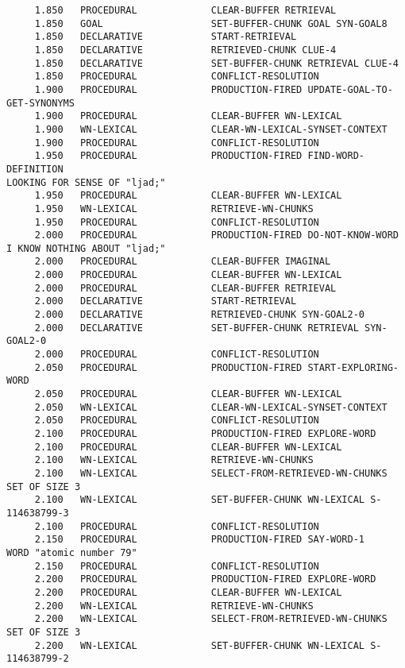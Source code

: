 \begin{verbatim}
     1.850   PROCEDURAL             CLEAR-BUFFER RETRIEVAL 
     1.850   GOAL                   SET-BUFFER-CHUNK GOAL SYN-GOAL8 
     1.850   DECLARATIVE            START-RETRIEVAL 
     1.850   DECLARATIVE            RETRIEVED-CHUNK CLUE-4 
     1.850   DECLARATIVE            SET-BUFFER-CHUNK RETRIEVAL CLUE-4 
     1.850   PROCEDURAL             CONFLICT-RESOLUTION 
     1.900   PROCEDURAL             PRODUCTION-FIRED UPDATE-GOAL-TO-GET-SYNONYMS 
     1.900   PROCEDURAL             CLEAR-BUFFER WN-LEXICAL 
     1.900   WN-LEXICAL             CLEAR-WN-LEXICAL-SYNSET-CONTEXT 
     1.900   PROCEDURAL             CONFLICT-RESOLUTION 
     1.950   PROCEDURAL             PRODUCTION-FIRED FIND-WORD-DEFINITION 
LOOKING FOR SENSE OF "ljad;" 
     1.950   PROCEDURAL             CLEAR-BUFFER WN-LEXICAL 
     1.950   WN-LEXICAL             RETRIEVE-WN-CHUNKS 
     1.950   PROCEDURAL             CONFLICT-RESOLUTION 
     2.000   PROCEDURAL             PRODUCTION-FIRED DO-NOT-KNOW-WORD 
I KNOW NOTHING ABOUT "ljad;" 
     2.000   PROCEDURAL             CLEAR-BUFFER IMAGINAL 
     2.000   PROCEDURAL             CLEAR-BUFFER WN-LEXICAL 
     2.000   PROCEDURAL             CLEAR-BUFFER RETRIEVAL 
     2.000   DECLARATIVE            START-RETRIEVAL 
     2.000   DECLARATIVE            RETRIEVED-CHUNK SYN-GOAL2-0 
     2.000   DECLARATIVE            SET-BUFFER-CHUNK RETRIEVAL SYN-GOAL2-0 
     2.000   PROCEDURAL             CONFLICT-RESOLUTION 
     2.050   PROCEDURAL             PRODUCTION-FIRED START-EXPLORING-WORD 
     2.050   PROCEDURAL             CLEAR-BUFFER WN-LEXICAL 
     2.050   WN-LEXICAL             CLEAR-WN-LEXICAL-SYNSET-CONTEXT 
     2.050   PROCEDURAL             CONFLICT-RESOLUTION 
     2.100   PROCEDURAL             PRODUCTION-FIRED EXPLORE-WORD 
     2.100   PROCEDURAL             CLEAR-BUFFER WN-LEXICAL 
     2.100   WN-LEXICAL             RETRIEVE-WN-CHUNKS 
     2.100   WN-LEXICAL             SELECT-FROM-RETRIEVED-WN-CHUNKS SET OF SIZE 3 
     2.100   WN-LEXICAL             SET-BUFFER-CHUNK WN-LEXICAL S-114638799-3 
     2.100   PROCEDURAL             CONFLICT-RESOLUTION 
     2.150   PROCEDURAL             PRODUCTION-FIRED SAY-WORD-1 
WORD "atomic number 79" 
     2.150   PROCEDURAL             CONFLICT-RESOLUTION 
     2.200   PROCEDURAL             PRODUCTION-FIRED EXPLORE-WORD 
     2.200   PROCEDURAL             CLEAR-BUFFER WN-LEXICAL 
     2.200   WN-LEXICAL             RETRIEVE-WN-CHUNKS 
     2.200   WN-LEXICAL             SELECT-FROM-RETRIEVED-WN-CHUNKS SET OF SIZE 3 
     2.200   WN-LEXICAL             SET-BUFFER-CHUNK WN-LEXICAL S-114638799-2 

\end{verbatim}
